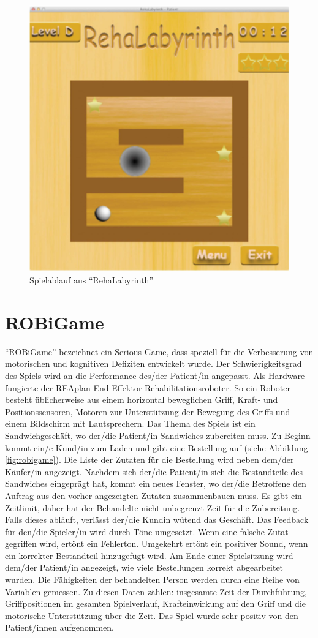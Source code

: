 \begin{figure}[h]
    \centering
    \includegraphics[width=0.6\linewidth]{figures/state_of_the_art/rehalabyrinth}
    \caption{Spielablauf aus \enquote{RehaLabyrinth} \cite{baranyi:reha_labyrinth:2013}}
    \label{fig:reha_labyrinth}
\end{figure}

\section{ROBiGame}\label{sec:robi-game}
\enquote{ROBiGame} bezeichnet ein Serious Game, dass speziell für die Verbesserung von motorischen und kognitiven Defiziten entwickelt wurde. Der Schwierigkeitsgrad des Spiels wird an die Performance des/der Patient/in angepasst. Als Hardware fungierte der REAplan End-Effektor Rehabilitationsroboter. So ein Roboter besteht üblicherweise aus einem horizontal beweglichen Griff, Kraft- und Positionssensoren, Motoren zur Unterstützung der Bewegung des Griffs und einem Bildschirm mit Lautsprechern. Das Thema des Spiels ist ein Sandwichgeschäft, wo der/die Patient/in Sandwiches zubereiten muss. Zu Beginn kommt ein/e Kund/in zum Laden und gibt eine Bestellung auf (siehe Abbildung \ref{fig:robigame}). Die Liste der Zutaten für die Bestellung wird neben dem/der Käufer/in angezeigt. Nachdem sich der/die Patient/in sich die Bestandteile des Sandwiches eingeprägt hat, kommt ein neues Fenster, wo der/die Betroffene den Auftrag aus den vorher angezeigten Zutaten zusammenbauen muss. Es gibt ein Zeitlimit, daher hat der Behandelte nicht unbegrenzt Zeit für die Zubereitung. Falls dieses abläuft, verlässt der/die Kundin wütend das Geschäft. Das Feedback für den/die Spieler/in wird durch Töne umgesetzt. Wenn eine falsche Zutat gegriffen wird, ertönt ein Fehlerton. Umgekehrt ertönt ein positiver Sound, wenn ein korrekter Bestandteil hinzugefügt wird. Am Ende einer Spielsitzung wird dem/der Patient/in angezeigt, wie viele Bestellungen korrekt abgearbeitet wurden. Die Fähigkeiten der behandelten Person werden durch eine Reihe von Variablen gemessen. Zu diesen Daten zählen: insgesamte Zeit der Durchführung, Griffpositionen im gesamten Spielverlauf, Krafteinwirkung auf den Griff und die motorische Unterstützung über die Zeit. Das Spiel wurde sehr positiv von den Patient/innen aufgenommen. \cite{heins:2017:robigame}

